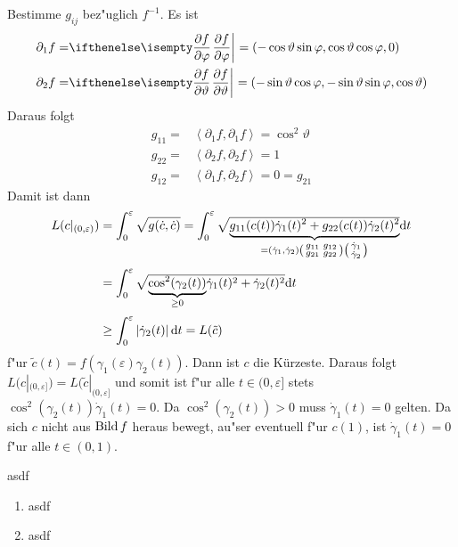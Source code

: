 \begin{Loes}
Bestimme $g_{ij}$ bez"uglich $f^{-1}$. Es ist
\begin{align*}
	\partial_1 f = & \pdifffrac{f}{\varphi} = \left( -\cos\vartheta \sin\varphi, \cos\vartheta \cos\varphi, 0 \right)\\
	\partial_2 f = & \pdifffrac{f}{\vartheta} = \left( -\sin\vartheta \cos\varphi, -\sin\vartheta \sin\varphi, \cos\vartheta \right)\\
\end{align*}
Daraus folgt
\begin{align*}
	g_{11} = & \left\langle \partial_1 f, \partial_1 f \right\rangle = \cos^2 \vartheta\\
	g_{22} = & \left\langle \partial_2 f, \partial_2 f \right\rangle = 1\\
	g_{12} = & \left\langle \partial_1 f, \partial_2 f \right\rangle = 0 = g_{21}
\end{align*}
Damit ist dann
\begin{align*}
	L(c|_{(0, \varepsilon)}) &= \int_0^\varepsilon \sqrt{g(\dot c, \dot c)} = \int_0^\varepsilon \sqrt{\vphantom{g(\dot c, \dot c)} \smash{\underbrace{g_{11}(c(t)) \dot\gamma_1(t)^2 + g_{22}(c(t)) \dot\gamma_2(t)^2}_{= (\dot\gamma_1, \dot\gamma_2) \left(\begin{smallmatrix} g_{11} & g_{12} \\ g_{21} & g_{22} \end{smallmatrix}\right) \left(\begin{smallmatrix} \dot\gamma_1 \\ \dot\gamma_2 \end{smallmatrix}\right)}}} \dop t\\
	&= \int_0^\varepsilon \sqrt{ \smash{\underbrace{\cos^2(\gamma_2(t))}_{\ge 0}} \dot\gamma_1(t)^2 + \dot\gamma_2(t)^2} \dop t \rule{0pt}{33pt}\\ %
	&\ge \int_0^\varepsilon \left| \dot\gamma_2(t) \right| \dop t =L(\tilde c) \rule{0pt}{25pt}%
\end{align*}
f"ur $\tilde c(t) = f(\gamma_1(\varepsilon) \gamma_2(t))$. Dann ist $c$ die Kürzeste. Daraus folgt $L(c|_{(0,\varepsilon]}) = L(\tilde c|_{(0,\varepsilon]}$ und somit ist f"ur alle $t \in (0,\varepsilon]$ stets $\cos^2(\gamma_2(t)) \dot\gamma_1(t) = 0$. Da $\cos^2(\gamma_2(t)) > 0$ muss $\dot\gamma_1(t) = 0$ gelten. Da sich $c$ nicht aus $\operatorname{Bild} f$ heraus bewegt, au"ser eventuell f"ur $c(1)$, ist $\dot\gamma_1(t) = 0$ f"ur alle $t \in (0,1)$.
\end{Loes}

\begin{Loes}
asdf
\end{Loes}

\begin{Loes}\begin{enumerate}[label=\alph*),leftmargin=*,widest=b]
\item
	asdf
\item
	asdf
\end{enumerate}\end{Loes}